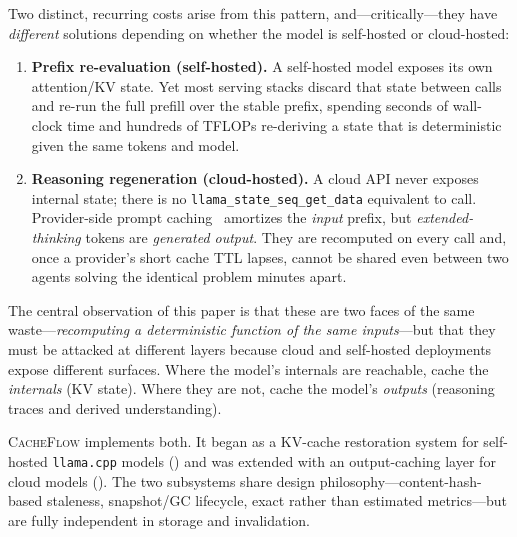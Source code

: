 \documentclass[10pt]{article}
\begin{document}
Two distinct, recurring costs arise from this pattern, and---critically---they
have \emph{different} solutions depending on whether the model is self-hosted or
cloud-hosted:

\begin{enumerate}
  \item \textbf{Prefix re-evaluation (self-hosted).} A self-hosted model
  exposes its own attention/KV state. Yet most serving stacks discard that
  state between calls and re-run the full prefill over the stable prefix,
  spending seconds of wall-clock time and hundreds of TFLOPs re-deriving a
  state that is deterministic given the same tokens and model.
  \item \textbf{Reasoning regeneration (cloud-hosted).} A cloud API never
  exposes internal state; there is no \texttt{llama\_state\_seq\_get\_data}
  equivalent to call. Provider-side prompt caching~\cite{anthropic-caching}
  amortizes the \emph{input} prefix, but \emph{extended-thinking} tokens are
  \emph{generated output}. They are recomputed on every call and, once a
  provider's short cache TTL lapses, cannot be shared even between two agents
  solving the identical problem minutes apart.
\end{enumerate}

The central observation of this paper is that these are two faces of the same
waste---\emph{recomputing a deterministic function of the same inputs}---but
that they must be attacked at different layers because cloud and self-hosted
deployments expose different surfaces. Where the model's internals are
reachable, cache the \emph{internals} (KV state). Where they are not, cache the
model's \emph{outputs} (reasoning traces and derived understanding).

\textsc{CacheFlow} implements both. It began as a KV-cache restoration system
for self-hosted \texttt{llama.cpp} models () and was extended with
an output-caching layer for cloud models (). The two subsystems
share design philosophy---content-hash-based staleness, snapshot/GC lifecycle,
exact rather than estimated metrics---but are fully independent in storage and
invalidation.
\end{document}
